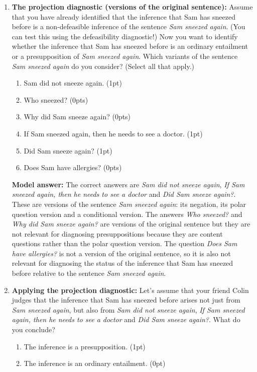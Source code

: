 \documentclass[a4,11pt]{article}
\begin{document}
\begin{enumerate}[leftmargin = 12pt]
 \item {\bf The projection diagnostic (versions of the original sentence):} Assume that you have already identified that the inference that Sam has sneezed before is a non-defeasible inference of the sentence {\em Sam sneezed again}. (You can test this using the defeasibility diagnostic!) Now you want to identify whether the inference that Sam has sneezed before is an ordinary entailment or a presupposition of {\em Sam sneezed again}. Which variants of the sentence {\em Sam sneezed again} do you consider? (Select all that apply.)
 
    \begin{enumerate}[noitemsep]
        \item Sam did not sneeze again. (1pt)
         \item Who sneezed? (0pts)
           \item Why did Sam sneeze again? (0pts)
           \item If Sam sneezed again, then he needs to see a doctor. (1pt)
           \item Did Sam sneeze again? (1pt)
           \item Does Sam have allergies? (0pts)
    \end{enumerate}
  
{\bf Model answer:}  The correct answers are {\em Sam did not sneeze again}, {\em If Sam sneezed again, then he needs to see a doctor} and {\em Did Sam sneeze again?}. These are versions of the sentence {\em Sam sneezed again}: its negation, its polar question version and a conditional version. The answers {\em Who sneezed?} and {\em  Why did Sam sneeze again?} are versions of the original sentence but they are not relevant for diagnosing presuppositions because they are content questions rather than the polar question version. The question {\em Does Sam have allergies?} is not a version of the original sentence, so it is also not relevant for diagnosing the status of the inference that Sam has sneezed before relative to the sentence {\em Sam sneezed again}.
  
  \item {\bf Applying the projection diagnostic:} Let's assume that your friend Colin judges that the inference that Sam has sneezed before arises not just from {\em Sam sneezed again}, but also from {\em Sam did not sneeze again}, {\em If Sam sneezed again, then he needs to see a doctor} and {\em Did Sam sneeze again?}. What do you conclude?
   
    \begin{enumerate}[noitemsep]
        \item The inference is a presupposition. (1pt)
 	\item The inference is an ordinary entailment. (0pt)
    \end{enumerate}
  

\end{enumerate}
\end{document}
